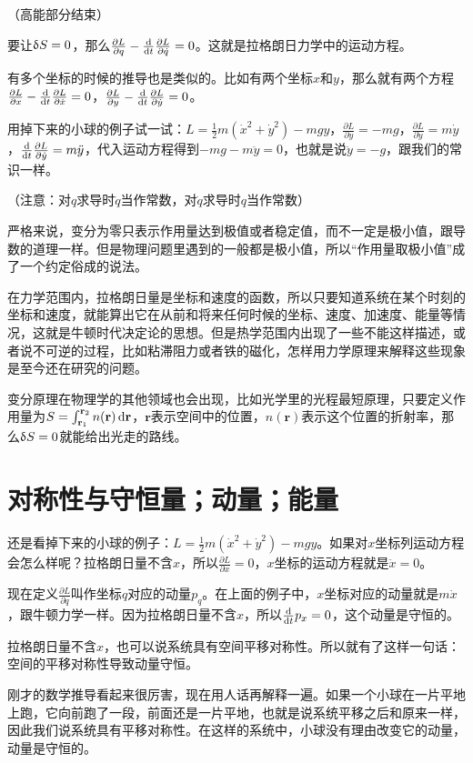 （高能部分结束）

要让$\mathop{}\!\updelta S=0$，那么$\frac{\partial L}{\partial q}-\frac{\mathop{}\!\mathrm{d}}{\mathop{}\!\mathrm{d} t} \frac{\partial L}{\partial \dot q}=0$。这就是拉格朗日力学中的运动方程。

有多个坐标的时候的推导也是类似的。比如有两个坐标$x$和$y$，那么就有两个方程$\frac{\partial L}{\partial x}-\frac{\mathop{}\!\mathrm{d}}{\mathop{}\!\mathrm{d} t} \frac{\partial L}{\partial \dot x}=0$，$\frac{\partial L}{\partial y}-\frac{\mathop{}\!\mathrm{d}}{\mathop{}\!\mathrm{d} t} \frac{\partial L}{\partial \dot y}=0$。

用掉下来的小球的例子试一试：$L=\frac{1}{2}m(\dot x^2+\dot y^2)-m g y$，$\frac{\partial L}{\partial y}=-m g$，$\frac{\partial L}{\partial \dot y}=m \dot y$，$\frac{\mathop{}\!\mathrm{d}}{\mathop{}\!\mathrm{d} t} \frac{\partial L}{\partial \dot y}=m \ddot y$，代入运动方程得到$-m g-m \ddot y=0$，也就是说$\ddot y=-g$，跟我们的常识一样。

（注意：对$q$求导时$\dot q$当作常数，对$\dot q$求导时$q$当作常数）

严格来说，变分为零只表示作用量达到极值或者稳定值，而不一定是极小值，跟导数的道理一样。但是物理问题里遇到的一般都是极小值，所以“作用量取极小值”成了一个约定俗成的说法。

在力学范围内，拉格朗日量是坐标和速度的函数，所以只要知道系统在某个时刻的坐标和速度，就能算出它在从前和将来任何时候的坐标、速度、加速度、能量等情况，这就是牛顿时代决定论的思想。但是热学范围内出现了一些不能这样描述，或者说不可逆的过程，比如粘滞阻力或者铁的磁化，怎样用力学原理来解释这些现象是至今还在研究的问题。

变分原理在物理学的其他领域也会出现，比如光学里的光程最短原理，只要定义作用量为$S=\int_{\mathbf{r}_1}^{\mathbf{r}_2} n(\mathbf{r}) \mathop{}\!\mathrm{d} \mathbf{r}$，$\mathbf{r}$表示空间中的位置，$n(\mathbf{r})$表示这个位置的折射率，那么$\mathop{}\!\updelta S=0$就能给出光走的路线。
\section{对称性与守恒量；动量；能量}
还是看掉下来的小球的例子：$L=\frac{1}{2}m(\dot x^2+\dot y^2)-m g y$。如果对$x$坐标列运动方程会怎么样呢？拉格朗日量不含$x$，所以$\frac{\partial L}{\partial x}=0$，$x$坐标的运动方程就是$\ddot x=0$。

现在定义$\frac{\partial L}{\partial \dot q}$叫作坐标$q$对应的动量$p_q$。在上面的例子中，$x$坐标对应的动量就是$m \dot x$，跟牛顿力学一样。因为拉格朗日量不含$x$，所以$\frac{\mathop{}\!\mathrm{d}}{\mathop{}\!\mathrm{d} t} p_x=0$，这个动量是守恒的。

拉格朗日量不含$x$，也可以说系统具有空间平移对称性。所以就有了这样一句话：空间的平移对称性导致动量守恒。

刚才的数学推导看起来很厉害，现在用人话再解释一遍。如果一个小球在一片平地上跑，它向前跑了一段，前面还是一片平地，也就是说系统平移之后和原来一样，因此我们说系统具有平移对称性。在这样的系统中，小球没有理由改变它的动量，动量是守恒的。

